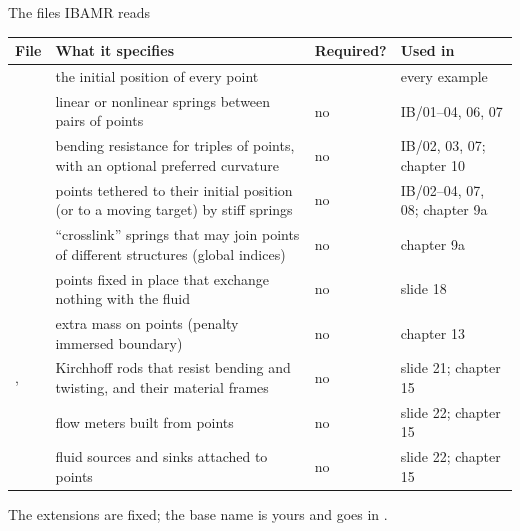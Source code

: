 \documentclass[aspectratio=169,11pt]{beamer}
\begin{document}
\begin{frame}{The files IBAMR reads}
\scriptsize
\begin{tabular}{@{}L{0.09\textwidth}L{0.4\textwidth}L{0.11\textwidth}L{0.28\textwidth}@{}}
\toprule
File & What it specifies & Required? & Used in\\
\midrule
{} & the initial position of every point &  & every example\\
 & linear or nonlinear springs between pairs of points & no & IB/01--04, 06, 07\\
 & bending resistance for triples of points, with an optional preferred curvature & no & IB/02, 03, 07; chapter 10\\
 & points tethered to their initial position (or to a moving target) by stiff springs & no & IB/02--04, 07, 08; chapter 9a\\
 & ``crosslink'' springs that may join points of different structures (global indices) & no & chapter 9a\\
 & points fixed in place that exchange nothing with the fluid & no & slide 18\\
 & extra mass on points (penalty immersed boundary) & no & chapter 13\\
,  & Kirchhoff rods that resist bending and twisting, and their material frames & no & slide 21; chapter 15\\
 & flow meters built from points & no & slide 22; chapter 15\\
 & fluid sources and sinks attached to points & no & slide 22; chapter 15\\
\bottomrule
\end{tabular}
\vspace{2mm}
\small The extensions are fixed; the base name is yours and goes in .
\end{frame}
\end{document}
